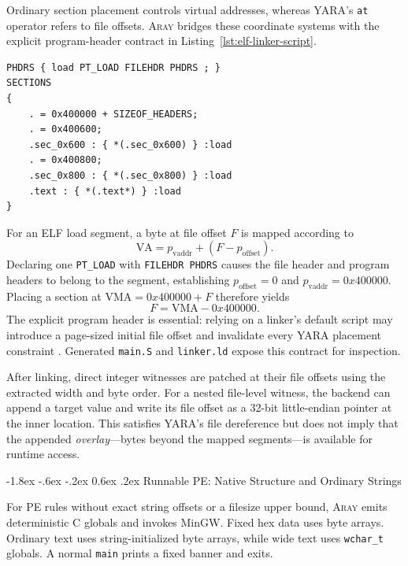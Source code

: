 \documentclass[11pt,twocolumn]{article}
\makeatletter
\newcommand{\tool}{\textsc{Aray}\xspace}
\newcommand{\code}[1]{\texttt{#1}}
\renewcommand\subsection{\@startsection{subsection}{2}{\z@}%
  {-1.8ex \@plus -.6ex \@minus -.2ex}%
  {0.6ex \@plus .2ex}%
  {\normalfont\normalsize\bfseries}}
\makeatother
\begin{document}
Ordinary section placement controls virtual addresses, whereas YARA's
\code{at} operator refers to file offsets. \tool bridges these coordinate
systems with the explicit program-header contract in
Listing~\ref{lst:elf-linker-script}.
\begin{lstlisting}[language=LinkerScript,style=araynumbered,caption={Generated GNU linker script for two exact-offset sections.},label={lst:elf-linker-script}]
PHDRS { load PT_LOAD FILEHDR PHDRS ; }
SECTIONS
{
    . = 0x400000 + SIZEOF_HEADERS;
    . = 0x400600;
    .sec_0x600 : { *(.sec_0x600) } :load
    . = 0x400800;
    .sec_0x800 : { *(.sec_0x800) } :load
    .text : { *(.text*) } :load
}
\end{lstlisting}
For an ELF load segment, a byte at file offset $F$ is mapped according to
\begin{equation}
  \mathrm{VA}=p_{\mathrm{vaddr}}+(F-p_{\mathrm{offset}}).
\end{equation}
Declaring one \code{PT\_LOAD} with \code{FILEHDR PHDRS} causes the file header
and program headers to belong to the segment, establishing
$p_{\mathrm{offset}}=0$ and $p_{\mathrm{vaddr}}=0x400000$. Placing a section at
$\mathrm{VMA}=0x400000+F$ therefore yields
\begin{equation}
  F=\mathrm{VMA}-0x400000.
\end{equation}
The explicit program header is essential: relying on a linker's default script
may introduce a page-sized initial file offset and invalidate every YARA
placement constraint \cite{sysvabi,gnuld}. Generated \code{main.S} and
\code{linker.ld} expose this contract for inspection.

After linking, direct integer witnesses are patched at their file offsets using
the extracted width and byte order. For a nested file-level witness, the backend
can append a target value and write its file offset as a 32-bit little-endian
pointer at the inner location. This satisfies YARA's file dereference but does
not imply that the appended \emph{overlay}---bytes beyond the mapped
segments---is available for runtime access.

\subsection{Runnable PE: Native Structure and Ordinary Strings}

For PE rules without exact string offsets or a filesize upper bound, \tool emits
deterministic C globals and invokes MinGW. Fixed hex data uses byte arrays.
Ordinary text uses string-initialized byte arrays, while wide text uses
\code{wchar\_t} globals. A normal \code{main} prints a fixed banner and exits.
\end{document}
